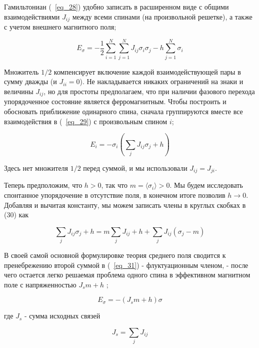 \documentclass[11pt]{article}
\begin{document}
Гамильтониан (~\ref{eq_28}) удобно записать в расширенном виде с общими взаимодействиями $J_{ij}$ между всеми спинами (на произвольной решетке), а также с учетом внешнего магнитного поля;

\begin{equation}
E_\sigma = -\frac{1}{2}\sum\limits_{i=1}^N\sum\limits_{j=1}^N J_{ij}\sigma_i\sigma_j - h\sum\limits_{j=1}^N \sigma_i
\label{eq_29}
\end{equation}

Множитель $1/2$ компенсирует включение каждой взаимодействующей пары в сумму дважды (и $J_{ii} = 0$). Не накладывается никаких ограничений на знаки и величины $J_{ij}$, но для простоты предполагаем, что при наличии фазового перехода упорядоченное состояние является ферромагнитным. Чтобы построить и обосновать приближение одинарного спина, сначала группируются вместе все взаимодействия в (~\ref{eq_29}) с произвольным спином $i$;

\begin{equation}
E_i = -\sigma_i(\sum\limits_{j}J_{ij}\sigma_j+h)
\label{eq_30}
\end{equation}

Здесь нет множителя $1/2$ перед суммой, и мы использовали $J_{ij} = J_{ji}$.

Теперь предположим, что $h> 0$, так что $m = \langle \sigma_i \rangle> 0$. Мы будем исследовать спонтанное упорядочение в отсутствие поля, в конечном итоге позволив $h → 0$. Добавляя и вычитая константу, мы можем записать члены в круглых скобках в (30) как

\begin{equation}
\sum\limits_jJ_{ij}\sigma_j+h = m \sum\limits_{j}J_{ij}+h+\sum\limits_{j}J_{ij}(\sigma_j-m)
\label{eq_31}
\end{equation}

В своей самой основной формулировке теория среднего поля сводится к пренебрежению второй суммой в (~\ref{eq_31}) - флуктуационным членом, - после чего остается легко решаемая проблема одного спина в эффективном магнитном поле с напряженностью $J_sm + h$ ;

\begin{equation}
E_\sigma=-(J_sm+h)\sigma
\label{eq_32}
\end{equation}

где $J_s$ - сумма исходных связей

\begin{equation}
J_s=\sum\limits_jJ_{ij}
\label{eq_33}
\end{equation}
\end{document}
